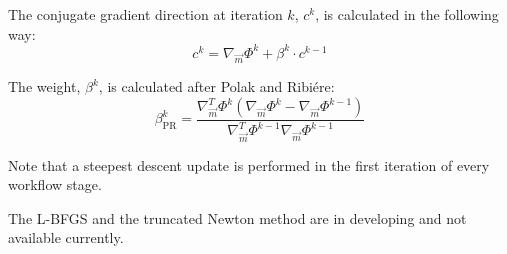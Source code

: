 \documentclass[pdftex,a4paper,parskip,listof=totoc,bibliography=totoc,onehalfspacing,12pt]{scrreprt}
\begin{document}
The conjugate gradient direction at iteration $k$, $c^k$, is calculated in the following way:
\begin{equation*}
 c^k =  \nabla_{\vec{m}} \Phi^k + \beta^k \cdot c^{k-1}
\end{equation*}

The weight, $\beta^k$, is calculated after Polak and Ribi\'{e}re:
\begin{equation*}
 \beta^k_{\mathrm{PR}} = \frac{ \nabla_{\vec{m}}^T \Phi^k (\nabla_{\vec{m}} \Phi^k - \nabla_{\vec{m}} \Phi^{k-1}) }{\nabla_{\vec{m}}^T \Phi^{k-1} \nabla_{\vec{m}} \Phi^{k-1}}
\end{equation*}

Note that a steepest descent update is performed in the first iteration of every workflow stage.

The L-BFGS and the truncated Newton method are in developing and not available currently.
\end{document}
